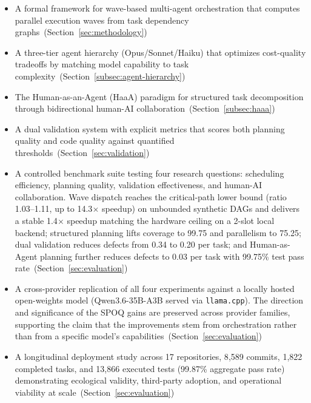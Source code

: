 \begin{itemize}
    \item A formal framework for wave-based multi-agent orchestration that
    computes parallel execution waves from task dependency
    graphs~(Section~\ref{sec:methodology})

    \item A three-tier agent hierarchy (Opus/Sonnet/Haiku) that optimizes
    cost-quality tradeoffs by matching model capability to task
    complexity~(Section~\ref{subsec:agent-hierarchy})

    \item The Human-as-an-Agent (HaaA) paradigm for structured task
    decomposition through bidirectional human-AI
    collaboration~(Section~\ref{subsec:haaa})

    \item A dual validation system with explicit metrics that scores both
    planning quality and code quality against quantified
    thresholds~(Section~\ref{sec:validation})

    \item A controlled benchmark suite testing four research questions:
    scheduling efficiency, planning quality, validation effectiveness, and
    human-AI collaboration. Wave dispatch reaches the critical-path lower
    bound (ratio 1.03--1.11, up to 14.3$\times$ speedup) on unbounded
    synthetic DAGs and delivers a stable 1.4$\times$ speedup matching the
    hardware ceiling on a 2-slot local backend;
    structured planning lifts coverage to 99.75 and parallelism to 75.25;
    dual validation reduces defects from 0.34 to 0.20 per task; and
    Human-as-Agent planning further reduces defects to 0.03 per task with
    99.75\% test pass rate~(Section~\ref{sec:evaluation})

    \item A cross-provider replication of all four experiments against a
    locally hosted open-weights model (Qwen3.6-35B-A3B served via
    \texttt{llama.cpp}). The direction and significance of the SPOQ gains
    are preserved across provider families, supporting the claim that the
    improvements stem from orchestration rather than from a specific
    model's capabilities~(Section~\ref{sec:evaluation})

    \item A longitudinal deployment study across 17 repositories, 8{,}589
    commits, 1{,}822 completed tasks, and 13{,}866 executed tests
    (99.87\% aggregate pass rate) demonstrating ecological validity,
    third-party adoption, and operational viability at
    scale~(Section~\ref{sec:evaluation})
\end{itemize}

